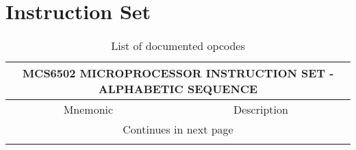 \documentclass{article}
\begin{document}
  \section{Instruction Set}
  \begin{longtable}{|c c|}

  \hline
  \multicolumn{2}{|c|}{MCS6502 MICROPROCESSOR INSTRUCTION SET - ALPHABETIC SEQUENCE}\\
  \hline
  Mnemonic & Description \\
  \hline
  \endfirsthead

  \hline
  \endhead

  \hline
  \multicolumn{2}{|c|}{Continues in next page}\\
  \hline
  \endfoot

  \hline
  \caption{List of documented opcodes}
  \endlastfoot


\end{longtable}
\end{document}
